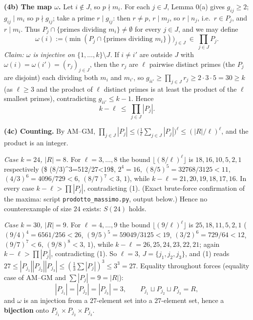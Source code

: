 \textbf{(4b) The map \(\omega\).} Let \(i\notin J\), so \(p\nmid m_i\).
For each \(j\in J\), Lemma 0(a) gives \(g_{ij}\ge2\); \(g_{ij}\mid m_i\)
so \(p\nmid g_{ij}\); take a prime \(r\mid g_{ij}\): then \(r\ne p\),
\(r\mid m_j\), so \(r\mid n_j\), i.e.~\(r\in P_j\), and \(r\mid m_i\).
Thus \(P_j\cap\{\text{primes dividing }m_i\}\ne\emptyset\) for every
\(j\in J\), and we may define
\[\omega(i):=\big(\min(P_j\cap\{\text{primes dividing }m_i\})\big)_{j\in J}\ \in\ \prod_{j\in J}P_j .\]
\emph{Claim: \(\omega\) is injective on \(\{1,\dots,k\}\setminus J\).}
If \(i\ne i'\) are outside \(J\) with
\(\omega(i)=\omega(i')=(r_j)_{j\in J}\), then the \(r_j\) are \(\ell\)
pairwise distinct primes (the \(P_j\) are disjoint) each dividing both
\(m_i\) and \(m_{i'}\), so
\(g_{ii'}\ge\prod_{j\in J}r_j\ge 2\cdot3\cdot5=30\ge k\) (as
\(\ell\ge3\) and the product of \(\ell\) distinct primes is at least the
product of the \(\ell\) smallest primes), contradicting
\(g_{ii'}\le k-1\). Hence \[k-\ell\ \le\ \prod_{j\in J}|P_j| . \tag{1}\]

\textbf{(4c) Counting.} By AM--GM,
\(\prod_{j\in J}|P_j|\le\big(\tfrac1\ell\sum_{j\in J}|P_j|\big)^{\ell}\le(|R|/\ell)^{\ell}\),
and the product is an integer.

\emph{Case \(k=24\), \(|R|=8\).} For \(\ell=3,\dots,8\) the bound
\(\lfloor (8/\ell)^\ell\rfloor\) is \(18,16,10,5,2,1\) respectively (\$
(8/3)\^{}3=512/27\textless19\$, \(2^4=16\), \((8/5)^5=32768/3125<11\),
\((4/3)^6=4096/729<6\), \((8/7)^7<3\), \(1\)), while
\(k-\ell=21,20,19,18,17,16\). In every case \(k-\ell>\prod|P_j|\),
contradicting (1). (Exact brute-force confirmation of the maxima: script
\texttt{prodotto\_massimo.py}, output below.) Hence no counterexample of
size \(24\) exists: \(S(24)\) holds.

\emph{Case \(k=30\), \(|R|=9\).} For \(\ell=4,\dots,9\) the bound
\(\lfloor (9/\ell)^\ell\rfloor\) is \(25,18,11,5,2,1\)
(\((9/4)^4=6561/256<26\), \((9/5)^5=59049/3125<19\),
\((3/2)^6=729/64<12\), \((9/7)^7<6\), \((9/8)^8<3\), \(1\)), while
\(k-\ell=26,25,24,23,22,21\); again \(k-\ell>\prod|P_j|\), contradicting
(1). So \(\ell=3\), \(J=\{j_1,j_2,j_3\}\), and (1) reads
\(27\le|P_{j_1}||P_{j_2}||P_{j_3}|\le(\tfrac13\sum|P_j|)^3\le 3^3=27\).
Equality throughout forces (equality case of AM--GM and
\(\sum|P_j|=9=|R|\)):
\[|P_{j_1}|=|P_{j_2}|=|P_{j_3}|=3,\qquad P_{j_1}\sqcup P_{j_2}\sqcup P_{j_3}=R,\]
and \(\omega\) is an injection from a \(27\)-element set into a
\(27\)-element set, hence a \textbf{bijection} onto
\(P_{j_1}\times P_{j_2}\times P_{j_3}\).

